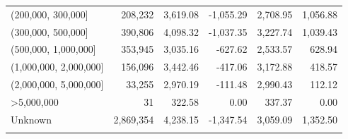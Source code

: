 \documentclass[10pt]{article}
\begin{document}
\begin{center}
\begin{minipage}{\textwidth}
\begin{tabularx}{\textwidth}{@{}Xrrrrr@{}}
{(200,000, 300,000]} & 208,232 & 3,619.08 & -1,055.29 & 2,708.95 & 1,056.88 \\
{(300,000, 500,000]} & 390,806 & 4,098.32 & -1,037.35 & 3,227.74 & 1,039.43 \\
{(500,000, 1,000,000]} & 353,945 & 3,035.16 & -627.62 & 2,533.57 & 628.94 \\
{(1,000,000, 2,000,000]} & 156,096 & 3,442.46 & -417.06 & 3,172.88 & 418.57 \\
{(2,000,000, 5,000,000]} & 33,255 & 2,970.19 & -111.48 & 2,990.43 & 112.12 \\
{>5,000,000} & 31 & 322.58 & 0.00 & 337.37 & 0.00 \\
{Unknown} & 2,869,354 & 4,238.15 & -1,347.54 & 3,059.09 & 1,352.50 \\
\addlinespace[3pt]
\bottomrule
\end{tabularx}
\par{}
\end{minipage}
\end{center}
\clearpage
\end{document}
